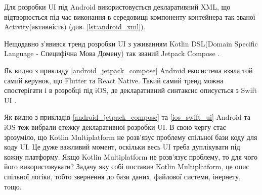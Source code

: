 Для розробки UI під Android використовується декларативний XML, що відтворюється під час виконання в середовищі компоненту
контейнера так званої Activity(активність) (див. \ref{lst:android_xml}).

Нещодавно з'явився тренд розробки UI з уживанням
Kotlin DSL(Domain Specific Language - Специфічна Мова Домену) так званий Jetpack Compose \cite{jetpack_compose}.

Як видно з прикладу \ref{android_jetpack_compose} Android екосистема взяла той самий керунок, що Flutter та React Native.
Такий самий тренд можна спостерігати і в розробці під iOS, де декларативний синтаксис описується з Swift UI \cite{swift_ui}.

Як видно з прикладів \ref{android_jetpack_compose} та \ref{ios_swift_ui} Android та iOS теж вибрали стежку декларативної розробки UI.
В свою чергу стає зрозуміло, що Kotlin Multiplatform не розв'язує проблему спільної бази коду для коду UI.
Це дуже важливий момент, оскільки весь UI треба дуплікувати під кожну платформу.
Якщо Kotlin Multiplatform не розв'язує проблему, то для чого його використовувати?
Задачу яку собі поставив Kotlin Multiplatform, це опис спільної логіки, тобто звернення до бази даних, файлової системи, інернету, тощо.

